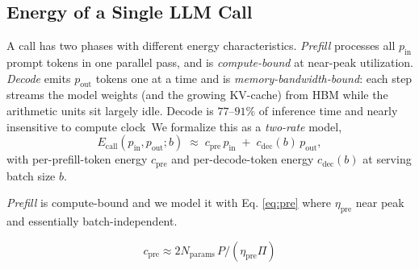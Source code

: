 \documentclass[journal]{IEEEtran}
\begin{document}
\subsection{Energy of a Single LLM Call}\label{sec:call}
A call has two phases with different energy characteristics.
\emph{Prefill} processes all $p_{\mathrm{in}}$ prompt tokens in one parallel pass, and is \textit{compute-bound} at
near-peak utilization. \emph{Decode} emits $p_{\mathrm{out}}$ tokens one at a time and is
\textit{memory-bandwidth-bound}: each step streams the model weights (and the growing KV-cache) from HBM while
the arithmetic units sit largely idle. Decode is $77$--$91\%$ of inference time and nearly
insensitive to compute clock~\cite{decode_membound2025}We formalize this as a \emph{two-rate} model,
\begin{equation}
E_{\mathrm{call}}(p_{\mathrm{in}},p_{\mathrm{out}};b)\;\approx\;
  c_{\mathrm{pre}}\,p_{\mathrm{in}}\;+\;c_{\mathrm{dec}}(b)\,p_{\mathrm{out}},
\label{eq:tworate}
\end{equation}
with per-prefill-token energy $c_{\mathrm{pre}}$ and per-decode-token energy $c_{\mathrm{dec}}(b)$ at
serving batch size $b$. 


\textit{Prefill} is compute-bound and we model it with  Eq. \ref{eq:pre} where $\eta_{\mathrm{pre}}$ near peak and essentially batch-independent.  

\begin{equation}
c_{\mathrm{pre}}\approx 2N_{\mathrm{params}}\,P/(\eta_{\mathrm{pre}}\Pi)
\label{eq:pre}
\end{equation}
\end{document}
